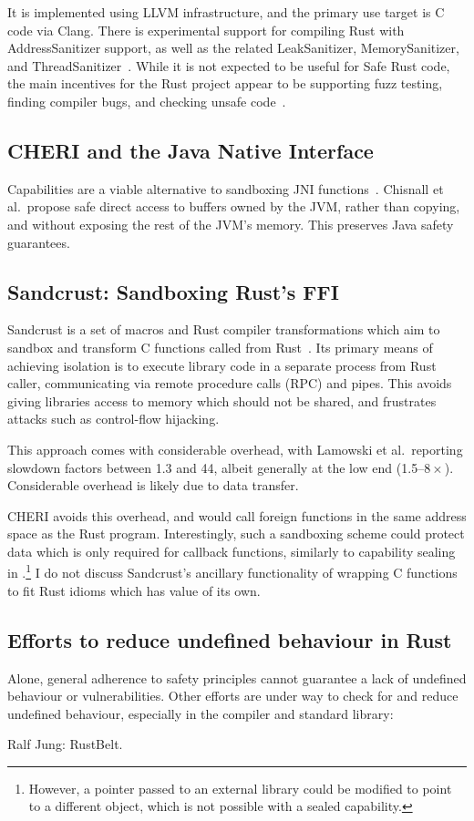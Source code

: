 \documentclass[dissertation.tex]{subfiles}
\begin{document}
It is implemented using LLVM infrastructure, and the primary use target
is C code via Clang.
There is experimental support for compiling Rust with AddressSanitizer
support, as well as the related LeakSanitizer, MemorySanitizer, and
ThreadSanitizer~\cite{rust-san}.
While it is not expected to be useful for Safe Rust code, the main
incentives for the Rust project appear to be supporting fuzz testing,
finding compiler bugs, and checking unsafe code~\cite{rust-asan-track}.


\subsection{CHERI and the Java Native Interface}
\label{sec:bg-cheri-jni}

Capabilities are a viable alternative to sandboxing JNI
functions~\cite{cheri-jni}.
Chisnall et al.\ propose safe direct access to buffers owned by the JVM,
rather than copying, and without exposing the rest of the JVM's memory.
This preserves Java safety guarantees.


\subsection{Sandcrust: Sandboxing Rust's FFI}
\label{sec:rel-sandcrust}

Sandcrust is a set of macros and Rust compiler transformations which aim
to sandbox and transform C functions called from
Rust~\cite{lamowski-sandcrust}.
Its primary means of achieving isolation is to execute library code in a
separate process from Rust caller, communicating via remote procedure
calls (RPC) and pipes.
This avoids giving libraries access to memory which should not be
shared, and frustrates attacks such as control-flow hijacking.

This approach comes with considerable overhead, with Lamowski et al.\
reporting slowdown factors between 1.3 and 44, albeit generally at the
low end (1.5--\(8\times\)).
Considerable overhead is likely due to data transfer.

CHERI avoids this overhead, and would call foreign functions in the same
address space as the Rust program.
Interestingly, such a sandboxing scheme could protect data which is only
required for callback functions, similarly to capability sealing in
\Cref{sec:eval-rust-xprocess}.\footnote{
    However, a pointer passed to an external library could be modified
    to point to a different object, which is not possible with a sealed
    capability.
}
I do not discuss Sandcrust's ancillary functionality of wrapping C
functions to fit Rust idioms which has value of its own.


\subsection{Efforts to reduce undefined behaviour in Rust}
Alone, general adherence to safety principles cannot guarantee a lack of
undefined behaviour or vulnerabilities.
Other efforts are under way to check for and reduce undefined behaviour,
especially in the compiler and standard library:

Ralf Jung: RustBelt.
\end{document}
